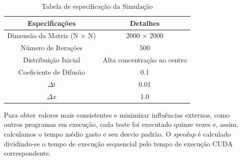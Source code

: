 \documentclass[12pt]{article}
\begin{document}
\begin{table}[ht]
  \centering
  \caption{Tabela de especificação da Simulação}
  \vspace{0.3cm}
  \begin{tabular}{||c c||}
    \hline
    Especificações                    & Detalhes                    \\ [0.5ex]
    \hline\hline
    Dimensão da Matriz (N $\times$ N) & 2000 $\times$ 2000          \\
    \hline
    Número de Iterações               & 500                        \\
    \hline
    Distribuição Inicial              & Alta concentração no centro \\
    \hline
    Coeficiente de Difusão            & 0.1                         \\
    \hline
    $\Delta t$                        & 0.01                        \\
    \hline
    $\Delta x$                        & 1.0                         \\
    \hline
  \end{tabular}\label{tab:especificacaoSimulacao}
\end{table}

Para obter valores mais consistentes e minimizar influências externas, como
outros programas em execução, cada teste foi executado quinze vezes e, assim,
calculamos o tempo médio gasto e seu desvio padrão. O \textit{speedup} é
calculado dividindo-se o tempo de execução sequencial pelo tempo de execução
CUDA correspondente.
\end{document}
